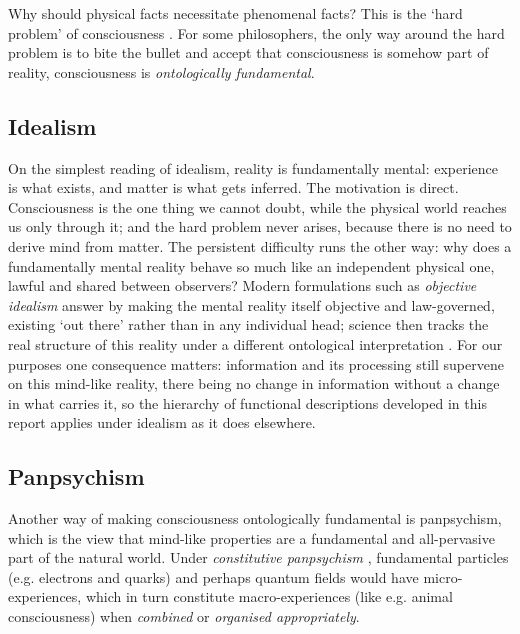 \documentclass[11pt, a4paper, onecolumn, gdm]{google}
\begin{document}
Why should physical facts necessitate phenomenal facts?
This is the `hard problem' of consciousness \citep{chalmers1996}.
For some philosophers, the only way around the hard problem is to bite the bullet and accept that consciousness is somehow part of reality, consciousness is \emph{ontologically fundamental}.

\subsection{Idealism}\label{idealism}

On the simplest reading of idealism, reality is fundamentally mental: experience is what exists, and matter is what gets inferred.
The motivation is direct.
Consciousness is the one thing we cannot doubt, while the physical world reaches us only through it; and the hard problem never arises, because there is no need to derive mind from matter.
The persistent difficulty runs the other way: why does a fundamentally mental reality behave so much like an independent physical one, lawful and shared between observers?
Modern formulations such as \emph{objective idealism} \citep{kastrup2019} answer by making the mental reality itself objective and law-governed, existing `out there' rather than in any individual head; science then tracks the real structure of this reality under a different ontological interpretation \citep{hoffman2014}.
For our purposes one consequence matters: information and its processing still supervene on this mind-like reality, there being no change in information without a change in what carries it, so the hierarchy of functional descriptions developed in this report applies under idealism as it does elsewhere.

\subsection{Panpsychism}\label{panpsychism}

Another way of making consciousness ontologically fundamental is panpsychism, which is the view that mind-like properties are a fundamental and all-pervasive part of the natural world.
Under \emph{constitutive panpsychism} \citep{chalmers2015}, fundamental particles (e.g. electrons and quarks) and perhaps quantum fields would have micro-experiences, which in turn constitute macro-experiences (like e.g. animal consciousness) when \emph{combined} or \emph{organised appropriately}.
\end{document}
